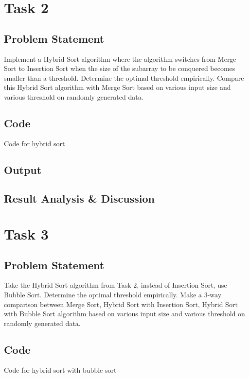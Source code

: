 \newpage
\section{Task 2}
\subsection{Problem Statement}
Implement a Hybrid Sort algorithm where the algorithm switches from Merge Sort
to Insertion Sort when the size of the subarray to be conquered becomes smaller
than a threshold. Determine the optimal threshold empirically. Compare this
Hybrid Sort algorithm with Merge Sort  based on various input size and various
threshold on randomly generated data.
\subsection{Code}
\begin{code}
    \label{code:hybrid}
    \caption{Code for hybrid sort}
\end{code}
\subsection{Output}
\subsection{Result Analysis \& Discussion}

\newpage
\section{Task 3}
\subsection{Problem Statement}
Take the Hybrid Sort algorithm from Task 2, instead of Insertion Sort, use
Bubble Sort. Determine the optimal threshold empirically. Make a 3-way
comparison between Merge Sort, Hybrid Sort with Insertion Sort, Hybrid Sort
with Bubble Sort algorithm based on various input size and various threshold on
randomly generated data.
\subsection{Code}
\begin{code}
    \label{code:bubble}
    \caption{Code for hybrid sort with bubble sort}
\end{code}
